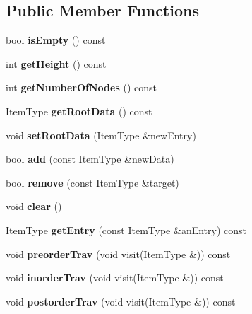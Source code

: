 \subsection*{Public Member Functions}
\begin{DoxyCompactItemize}
\item 
\hypertarget{class_binary_search_tree_acbe0ba28d119b4a36773d5d608938081}{}\label{class_binary_search_tree_acbe0ba28d119b4a36773d5d608938081} 
bool {\bfseries is\+Empty} () const
\item 
\hypertarget{class_binary_search_tree_a04eaf25b5dd9edabcbca44e323aac600}{}\label{class_binary_search_tree_a04eaf25b5dd9edabcbca44e323aac600} 
int {\bfseries get\+Height} () const
\item 
\hypertarget{class_binary_search_tree_a128756fb6e116279cf2c2b99afa02dfd}{}\label{class_binary_search_tree_a128756fb6e116279cf2c2b99afa02dfd} 
int {\bfseries get\+Number\+Of\+Nodes} () const
\item 
\hypertarget{class_binary_search_tree_ae07638c930af66e75601d9570a2ea2de}{}\label{class_binary_search_tree_ae07638c930af66e75601d9570a2ea2de} 
Item\+Type {\bfseries get\+Root\+Data} () const
\item 
\hypertarget{class_binary_search_tree_a7bb2a0da26e2e846981e2dc7a6ac101b}{}\label{class_binary_search_tree_a7bb2a0da26e2e846981e2dc7a6ac101b} 
void {\bfseries set\+Root\+Data} (Item\+Type \&new\+Entry)
\item 
\hypertarget{class_binary_search_tree_a56fc2830f911fe6e082df6ac8f4f6cce}{}\label{class_binary_search_tree_a56fc2830f911fe6e082df6ac8f4f6cce} 
bool {\bfseries add} (const Item\+Type \&new\+Data)
\item 
\hypertarget{class_binary_search_tree_ae3242f442fbd2ee75c1a026a7e023f86}{}\label{class_binary_search_tree_ae3242f442fbd2ee75c1a026a7e023f86} 
bool {\bfseries remove} (const Item\+Type \&target)
\item 
\hypertarget{class_binary_search_tree_ae691f40ac35ced8ef7d0661f4dcbdc8a}{}\label{class_binary_search_tree_ae691f40ac35ced8ef7d0661f4dcbdc8a} 
void {\bfseries clear} ()
\item 
\hypertarget{class_binary_search_tree_a3fee4b81cd95e3be7a6f9b0648b5b6de}{}\label{class_binary_search_tree_a3fee4b81cd95e3be7a6f9b0648b5b6de} 
Item\+Type {\bfseries get\+Entry} (const Item\+Type \&an\+Entry) const
\item 
\hypertarget{class_binary_search_tree_a744f02938ba3fe5006724188978fa56f}{}\label{class_binary_search_tree_a744f02938ba3fe5006724188978fa56f} 
void {\bfseries preorder\+Trav} (void visit(Item\+Type \&)) const
\item 
\hypertarget{class_binary_search_tree_a39b1fed377231ba7a118b60cb1c2238f}{}\label{class_binary_search_tree_a39b1fed377231ba7a118b60cb1c2238f} 
void {\bfseries inorder\+Trav} (void visit(Item\+Type \&)) const
\item 
\hypertarget{class_binary_search_tree_a1bd5beb35a142b659eebb445c289d347}{}\label{class_binary_search_tree_a1bd5beb35a142b659eebb445c289d347} 
void {\bfseries postorder\+Trav} (void visit(Item\+Type \&)) const
\end{DoxyCompactItemize}
